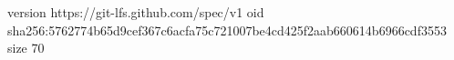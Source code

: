 version https://git-lfs.github.com/spec/v1
oid sha256:5762774b65d9cef367c6acfa75c721007be4cd425f2aab660614b6966cdf3553
size 70
